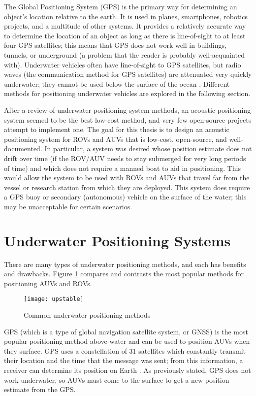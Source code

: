 \documentclass[11pt]{ucthesisCP}
\newcommand{\captionfonts}{\small\ssp}
\begin{document}
The Global Positioning System (GPS) is the primary way for determining an object’s location relative to the earth. It is used in planes, smartphones, robotics projects, and a multitude of other systems. It provides a relatively accurate way to determine the location of an object as long as there is line-of-sight to at least four GPS satellites; this means that GPS does not work well in buildings, tunnels, or underground (a problem that the reader is probably well-acquainted with). Underwater vehicles often have line-of-sight to GPS satellites, but radio waves (the communication method for GPS satellites) are attenuated very quickly underwater; they cannot be used below the surface of the ocean \cite{surveyurpn}. Different methods for positioning underwater vehicles are explored in the following section.

After a review of underwater positioning system methods, an acoustic positioning system seemed to be the best low-cost method, and very few open-source projects attempt to implement one. The goal for this thesis is to design an acoustic positioning system for ROVs and AUVs that is low-cost, open-source, and well-documented. In particular, a system was desired whose position estimate does not drift over time (if the ROV/AUV needs to stay submerged for very long periods of time) and which does not require a manned boat to aid in positioning. This would allow the system to be used with ROVs and AUVs that travel far from the vessel or research station from which they are deployed. This system does require a GPS buoy or secondary (autonomous) vehicle on the surface of the water; this may be unacceptable for certain scenarios.

\section{Underwater Positioning Systems} \label{sec:1s2}
There are many types of underwater positioning methods, and each has benefits and drawbacks. Figure \ref{fig:upstable} compares and contrasts the most popular methods for positioning AUVs and ROVs.

\begin{figure}[htbp]
	\centering
	\texttt{[image: upstable]}
	\captionfonts
	\caption{Common underwater positioning methods}
	\label{fig:upstable}
\end{figure}

GPS (which is a type of global navigation satellite system, or GNSS) is the most popular positioning method above-water and can be used to position AUVs when they surface. GPS uses a constellation of 31 satellites which constantly transmit their location and the time that the message was sent; from this information, a receiver can determine its position on Earth \cite{faagps}. As previously stated, GPS does not work underwater, so AUVs must come to the surface to get a new position estimate from the GPS.
\end{document}
